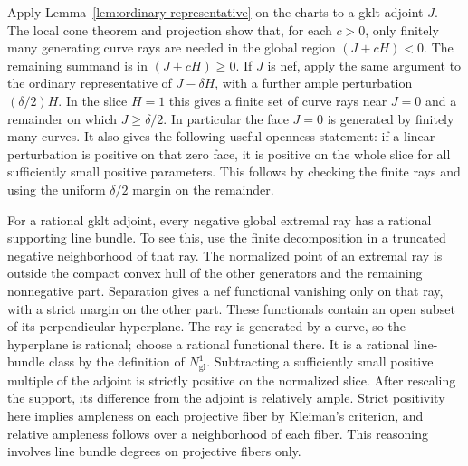Apply Lemma~\ref{lem:ordinary-representative} on the charts to a gklt
adjoint $J$.  The local cone theorem and projection show that, for each
$c>0$, only finitely many generating curve rays are needed in the
global region $(J+cH)<0$.  The remaining summand is in
$(J+cH)\geq0$.  If $J$ is nef, apply the same argument to the
ordinary representative of $J-\delta H$, with a further ample
perturbation $(\delta/2)H$.  In the slice $H=1$ this gives a finite
set of curve rays near $J=0$ and a remainder on which
$J\geq\delta/2$.  In particular the face $J=0$ is generated by
finitely many curves.  It also gives the following useful openness
statement: if a linear perturbation is positive on that zero face,
it is positive on the whole slice for all sufficiently small positive
parameters.  This follows by checking the finite rays and using the
uniform $\delta/2$ margin on the remainder.

For a rational gklt adjoint, every negative global extremal ray has a
rational supporting line bundle.  To see this, use the finite
decomposition in a truncated negative neighborhood of that ray.
The normalized point of an extremal ray is outside the compact convex
hull of the other generators and the remaining nonnegative part.
Separation gives a nef functional vanishing only on that ray, with a
strict margin on the other part.  These functionals contain an open
subset of its perpendicular hyperplane.  The ray is generated by a
curve, so the hyperplane is rational; choose a rational functional
there.  It is a rational line-bundle class by the definition of
$N^1_{\mathrm{gl}}$.  Subtracting a sufficiently small positive
multiple of the adjoint is strictly positive on the normalized slice.
After rescaling the support, its difference from the adjoint is
relatively ample.  Strict positivity here implies ampleness on each
projective fiber by Kleiman's criterion, and relative ampleness follows
over a neighborhood of each fiber.  This reasoning involves line
bundle degrees on projective fibers only.

